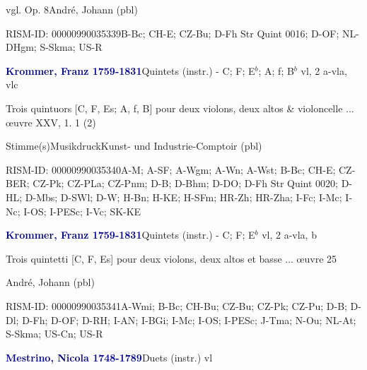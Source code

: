 \documentclass[twocolumn, 12pt]{book}
\begin{document}
\par vgl. Op. 8\newline André, Johann  (pbl)
\par RISM-ID: 00000990035339\newline B-Bc; CH-E; CZ-Bu; D-Fh  Str Quint 0016; D-OF; NL-DHgm; S-Skma; US-R
\par \vspace{16pt} \textcolor{darkblue}{\textbf{Krommer, Franz  1759-1831}}\hfillplus{\textbf{[300]}}\newline Quintets (instr.) - C; F; E$^b$; A; f; B$^b$ vl, 2 a-vla, vlc
\par \begin{itshape}Trois quintuors [C, F, Es; A, f, B] pour deux violons, deux altos \& violoncelle ... œuvre XXV, 1. 1 (2)\end{itshape} 
\par \textcolor{darkblue}{}  Stimme(s)\newline Musikdruck\newline Kunst- und Industrie-Comptoir  (pbl)
\par RISM-ID: 00000990035340\newline A-M; A-SF; A-Wgm; A-Wn; A-Wst; B-Bc; CH-E; CZ-BER; CZ-Pk; CZ-PLa; CZ-Pnm; D-B; D-Bhm; D-DO; D-Fh  Str Quint 0020; D-HL; D-Mbs; D-SWl; D-W; H-Bn; H-KE; H-SFm; HR-Zh; HR-Zha; I-Fc; I-Mc; I-Nc; I-OS; I-PESc; I-Vc; SK-KE
\par \vspace{16pt} \textcolor{darkblue}{\textbf{Krommer, Franz  1759-1831}}\hfillplus{\textbf{[301]}}\newline Quintets (instr.) - C; F; E$^b$ vl, 2 a-vla, b
\par \begin{itshape}Trois quintetti [C, F, Es] pour deux violons, deux altos et basse ... œuvre 25\end{itshape} \newline André, Johann  (pbl)
\par RISM-ID: 00000990035341\newline A-Wmi; B-Bc; CH-Bu; CZ-Bu; CZ-Pk; CZ-Pu; D-B; D-Dl; D-Fh; D-OF; D-RH; I-AN; I-BGi; I-Mc; I-OS; I-PESc; J-Tma; N-Ou; NL-At; S-Skma; US-Cn; US-R
\par \vspace{16pt} \textcolor{darkblue}{\textbf{Mestrino, Nicola  1748-1789}}\hfillplus{\textbf{[302]}}\newline Duets (instr.) vl
\end{document}
